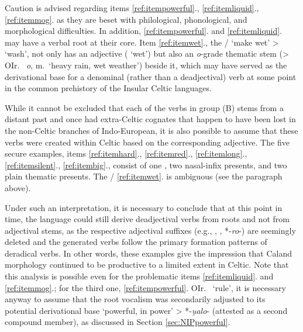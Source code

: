 \documentclass[output=paper,colorlinks,citecolor=brown]{langscibook}
\begin{document}
Caution is advised regarding items \ref{ref:itempowerful}., \ref{ref:itemliquid}., \ref{ref:itemmog}. as they are beset with philological, phonological, and morphological difficulties. In addition, \ref{ref:itempowerful}. and \ref{ref:itemliquid}. may have a verbal root at their core. Item \ref{ref:itemwet}., the /  ‘make wet’ > ‘wash’, not only has an adjective ( ‘wet’) but also an \textit{o}-grade thematic stem  (> OIr.\   \textit{o}, m.\ ‘heavy rain, wet weather’) beside it, which may have served as the derivational base for a denominal  (rather than a deadjectival) verb at some point in the common prehistory of the Insular Celtic languages. 

While it cannot be excluded that each of the verbs in group (B) stems from a distant past and once had extra-Celtic cognates that happen to have been lost in the non-Celtic branches of Indo-European, it is also possible to assume that these verbs were created within Celtic based on the corresponding adjective. The five secure examples, items \ref{ref:itemhard}., \ref{ref:itemred}., \ref{ref:itemlong}., \ref{ref:itemsilent}., \ref{ref:itembig}., consist of one ,  two nasal-infix presents, and two plain thematic presents. The / \ref{ref:itemwet}. is ambiguous (see the paragraph above).

Under such an interpretation, it is necessary to conclude that at this point in time, the language could still derive deadjectival verbs from roots and not from adjectival stems, as the respective adjectival suffixes (e.g., , , *-\textit{ro}\nobreakdash-) are seemingly deleted and the generated verbs follow the primary formation patterns of deradical verbs. In other words, these examples give the impression that Caland morphology continued to be productive to a limited extent in Celtic. Note that this analysis is possible even for the problematic items \ref{ref:itemliquid}. and \ref{ref:itemmog}.; for the third one, \ref{ref:itempowerful}. OIr.\   ‘rule’, it is necessary anyway to assume that the root vocalism was secondarily adjusted to its potential derivational base  ‘powerful, in power’ > *-\textit{u̯alo}-  (attested as a second compound member), as discussed in Section \ref{sec:NIPpowerful}.
\end{document}
